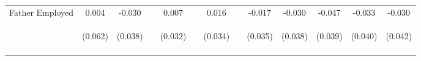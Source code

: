 \begin{tabular}{lcccccccccccc}
\noalign{\smallskip}Father Employed & 0.004 & -0.030 &  & 0.007 &  & 0.016 &  & -0.017 & -0.030 & -0.047 & -0.033 & -0.030\\
 & \begin{footnotesize}(0.062)\end{footnotesize} & \begin{footnotesize}(0.038)\end{footnotesize} & \begin{footnotesize}\end{footnotesize} & \begin{footnotesize}(0.032)\end{footnotesize} & \begin{footnotesize}\end{footnotesize} & \begin{footnotesize}(0.034)\end{footnotesize} & \begin{footnotesize}\end{footnotesize} & \begin{footnotesize}(0.035)\end{footnotesize} & \begin{footnotesize}(0.038)\end{footnotesize} & \begin{footnotesize}(0.039)\end{footnotesize} & \begin{footnotesize}(0.040)\end{footnotesize} & \begin{footnotesize}(0.042)\end{footnotesize}\\
\noalign{\smallskip}\hline\end{tabular}\\
